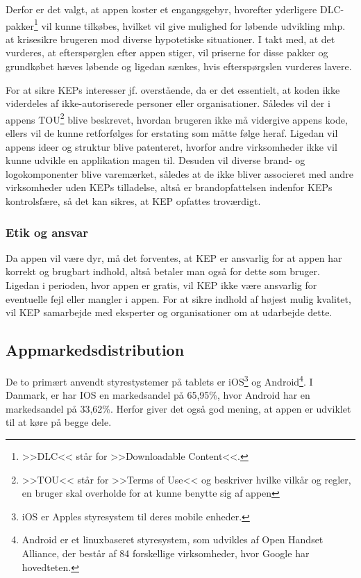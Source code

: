 Derfor er det valgt, at appen koster et engangsgebyr, hvorefter yderligere DLC-pakker\footnote{>>DLC<< står for >>Downloadable Content<<.} vil kunne tilkøbes, hvilket vil give mulighed for løbende udvikling mhp. at krisesikre brugeren mod diverse hypotetiske situationer. I takt med, at det vurderes, at efterspørglen efter appen stiger, vil priserne for disse pakker og grundkøbet hæves løbende og ligedan sænkes, hvis efterspørgslen vurderes lavere.

For at sikre KEPs interesser jf. overstående, da er det essentielt, at koden ikke viderdeles af ikke-autoriserede personer eller organisationer. Således vil der i appens TOU\footnote{>>TOU<< står for >>Terms of Use<< og beskriver hvilke vilkår og regler, en bruger skal overholde for at kunne benytte sig af appen} blive beskrevet, hvordan brugeren ikke må vidergive appens kode, ellers vil de kunne retforfølges for erstating som måtte følge heraf. Ligedan vil appens ideer og struktur blive patenteret, hvorfor andre virksomheder ikke vil kunne udvikle en applikation magen til. Desuden vil diverse brand- og logokomponenter blive varemærket, således at de ikke bliver associeret med andre virksomheder uden KEPs tilladelse, altså er brandopfattelsen indenfor KEPs kontrolsfære, så det kan sikres, at KEP opfattes troværdigt. 

\subsubsection{Etik og ansvar \label{sec:etik-og-ansvar}}
Da appen vil være dyr, må det forventes, at KEP er ansvarlig for at appen har korrekt og brugbart indhold, altså betaler man også for dette som bruger. Ligedan i perioden, hvor appen er gratis, vil KEP ikke være ansvarlig for eventuelle fejl eller mangler i appen. For at sikre indhold af højest mulig kvalitet, vil KEP samarbejde med eksperter og organisationer om at udarbejde dette.
\newpage 
\subsection{Appmarkedsdistribution}
De to primært anvendt styrestystemer på tablets er iOS\footnote{iOS er Apples styresystem til deres mobile enheder.} og Android\footnote{Android er et linuxbaseret styresystem, som udvikles af Open Handset Alliance, der består af 84 forskellige virksomheder, hvor Google har hovedteten.\cite{Android-wiki}}. 
I Danmark, er har IOS en markedsandel på 65,95\%, hvor Android har en markedsandel på 33,62\%\cite{markedsandelkilde}. Herfor giver det også god mening, at appen er udviklet til at køre på begge dele.


